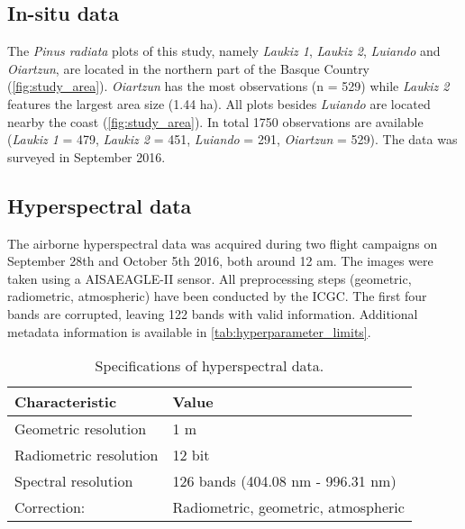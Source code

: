 \documentclass[review]{elsarticle}
\begin{document}
\subsection{In-situ data}

\noindent The \textit{Pinus radiata} plots of this study, namely \textit{Laukiz 1}, \textit{Laukiz 2}, \textit{Luiando} and \textit{Oiartzun}, are located in the northern part of the Basque Country (\autoref{fig:study_area}).
\textit{Oiartzun} has the most observations (n = 529) while \textit{Laukiz 2} features the largest area size (1.44 ha).
All plots besides \textit{Luiando} are located nearby the coast (\autoref{fig:study_area}).
In total 1750 observations are available (\textit{Laukiz 1} = 479, \textit{Laukiz 2} = 451, \textit{Luiando} = 291, \textit{Oiartzun} = 529).
The data was surveyed in September 2016.



\subsection{Hyperspectral data}

\noindent The airborne hyperspectral data was acquired during two flight campaigns on September 28th and October 5th 2016, both around 12 am.
The images were taken using a AISAEAGLE-II sensor.
All preprocessing steps (geometric, radiometric, atmospheric) have been conducted by the \ac{ICGC}.
The first four bands are corrupted, leaving 122 bands with valid information.
Additional metadata information is available in \autoref{tab:hyperparameter_limits}.

\begin{table}[b!]
\centering
\caption[t]{Specifications of hyperspectral data.}
\begingroup\footnotesize
\begin{tabular}{ll}
	\\
	Characteristic         & Value                               \\
	\hline
	Geometric resolution   & 1 m                                 \\
	Radiometric resolution & 12 bit                              \\
	Spectral resolution    & 126 bands (404.08 nm - 996.31 nm)   \\
	Correction:            & Radiometric, geometric, atmospheric
\end{tabular}
\endgroup
\label{tab:hyperparameter_limits}
\end{table}
\end{document}
